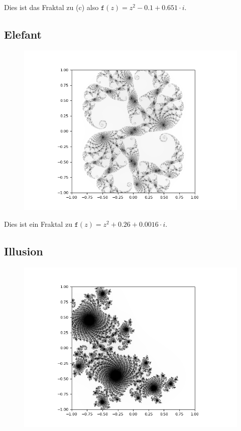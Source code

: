 \documentclass[12pt]{scrartcl}
\begin{document}
Dies ist das Fraktal zu (c) also $\texttt{f}(z) = z^2 - 0.1 + 0.651 \cdot i$.

\subsection{Elefant}

\begin{figure}[H]
\centering
\includegraphics[scale=0.5]{Elefant0.png}
\caption{}
\label{Elefant0}
\end{figure}

Dies ist ein Fraktal zu $\texttt{f}(z) = z^2 + 0.26 + 0.0016 \cdot i$.

\subsection{Illusion}

\begin{figure}[H]
\centering
\includegraphics[scale=0.5]{Illusion0.png}
\caption{}
\label{Illusion0}
\end{figure}
\end{document}
